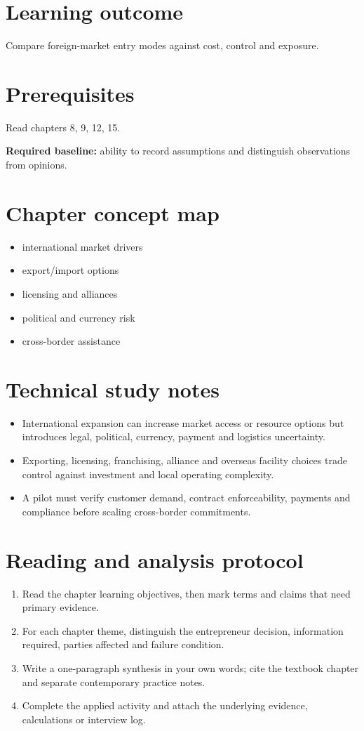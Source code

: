 \documentclass[11pt,letterpaper]{article}
\begin{document}
\SuiteOpen
\section{Learning outcome}
Compare foreign-market entry modes against cost, control and exposure.
\section{Prerequisites}
Read chapters 8, 9, 12, 15.\par\textbf{Required baseline:} ability to record assumptions and distinguish observations from opinions.
\section{Chapter concept map}
\begin{itemize}[leftmargin=*,itemsep=3pt]
\item international market drivers
\item export/import options
\item licensing and alliances
\item political and currency risk
\item cross-border assistance
\end{itemize}

\section{Technical study notes}
\begin{itemize}[leftmargin=*,itemsep=3pt]
\item International expansion can increase market access or resource options but introduces legal, political, currency, payment and logistics uncertainty.
\item Exporting, licensing, franchising, alliance and overseas facility choices trade control against investment and local operating complexity.
\item A pilot must verify customer demand, contract enforceability, payments and compliance before scaling cross-border commitments.
\end{itemize}

\section{Reading and analysis protocol}
\begin{enumerate}[leftmargin=*,itemsep=5pt]
\item Read the chapter learning objectives, then mark terms and claims that need primary evidence.
\item For each chapter theme, distinguish the entrepreneur decision, information required, parties affected and failure condition.
\item Write a one-paragraph synthesis in your own words; cite the textbook chapter and separate contemporary practice notes.
\item Complete the applied activity and attach the underlying evidence, calculations or interview log.
\end{enumerate}
\end{document}
